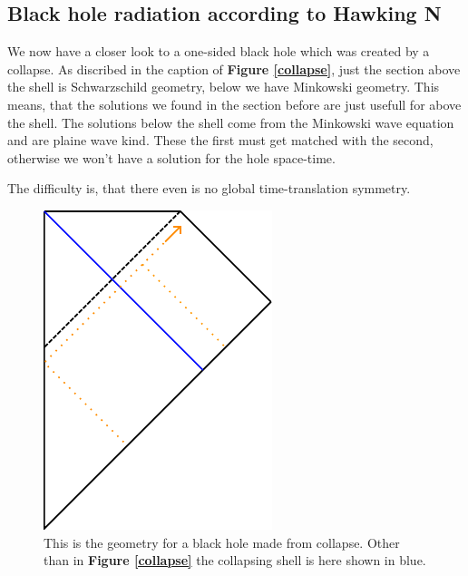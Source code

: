 \subsection{Black hole radiation according to Hawking N} 
	We now have a closer look to a one-sided black hole which was created by a collapse. As discribed in the caption of \textbf{Figure \ref{collapse}}, just the section above the shell is Schwarzschild geometry, below we have Minkowski geometry. This means, that the solutions we found in the section before are just usefull for above the shell. The solutions below the shell come from the Minkowski wave equation and are plaine wave kind. These the first must get matched with the second, otherwise we won't have a solution for the hole space-time.
	
	The difficulty is, that there even is no global time-translation symmetry. 
	\begin{figure}
		\begin{center}
			\includegraphics[scale=1]{collapse2}
			\caption{This is the geometry for a black hole made from collapse. Other than in \textbf{Figure \ref{collapse}} the collapsing shell is here shown in blue.} \label{collapse2}
		\end{center}
	\end{figure}